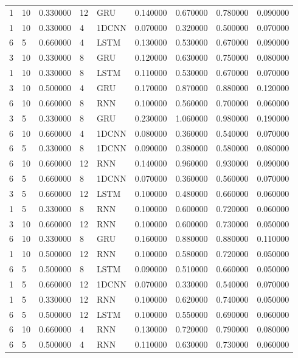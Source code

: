 \begin{tabular}{llrllrrrr}
1 & 10 & 0.330000 & 12 & GRU & 0.140000 & 0.670000 & 0.780000 & 0.090000 \\
1 & 10 & 0.330000 & 4 & 1DCNN & 0.070000 & 0.320000 & 0.500000 & 0.070000 \\
6 & 5 & 0.660000 & 4 & LSTM & 0.130000 & 0.530000 & 0.670000 & 0.090000 \\
3 & 10 & 0.330000 & 8 & GRU & 0.120000 & 0.630000 & 0.750000 & 0.080000 \\
1 & 10 & 0.330000 & 8 & LSTM & 0.110000 & 0.530000 & 0.670000 & 0.070000 \\
3 & 10 & 0.500000 & 4 & GRU & 0.170000 & 0.870000 & 0.880000 & 0.120000 \\
6 & 10 & 0.660000 & 8 & RNN & 0.100000 & 0.560000 & 0.700000 & 0.060000 \\
3 & 5 & 0.330000 & 8 & GRU & 0.230000 & 1.060000 & 0.980000 & 0.190000 \\
6 & 10 & 0.660000 & 4 & 1DCNN & 0.080000 & 0.360000 & 0.540000 & 0.070000 \\
6 & 5 & 0.330000 & 8 & 1DCNN & 0.090000 & 0.380000 & 0.580000 & 0.080000 \\
6 & 10 & 0.660000 & 12 & RNN & 0.140000 & 0.960000 & 0.930000 & 0.090000 \\
6 & 5 & 0.660000 & 8 & 1DCNN & 0.070000 & 0.360000 & 0.560000 & 0.070000 \\
3 & 5 & 0.660000 & 12 & LSTM & 0.100000 & 0.480000 & 0.660000 & 0.060000 \\
1 & 5 & 0.330000 & 8 & RNN & 0.100000 & 0.600000 & 0.720000 & 0.060000 \\
3 & 10 & 0.660000 & 12 & RNN & 0.100000 & 0.600000 & 0.730000 & 0.050000 \\
6 & 10 & 0.330000 & 8 & GRU & 0.160000 & 0.880000 & 0.880000 & 0.110000 \\
1 & 10 & 0.500000 & 12 & RNN & 0.100000 & 0.580000 & 0.720000 & 0.050000 \\
6 & 5 & 0.500000 & 8 & LSTM & 0.090000 & 0.510000 & 0.660000 & 0.050000 \\
1 & 5 & 0.660000 & 12 & 1DCNN & 0.070000 & 0.330000 & 0.540000 & 0.070000 \\
1 & 5 & 0.330000 & 12 & RNN & 0.100000 & 0.620000 & 0.740000 & 0.050000 \\
6 & 5 & 0.500000 & 12 & LSTM & 0.100000 & 0.550000 & 0.690000 & 0.060000 \\
6 & 10 & 0.660000 & 4 & RNN & 0.130000 & 0.720000 & 0.790000 & 0.080000 \\
6 & 5 & 0.500000 & 4 & RNN & 0.110000 & 0.630000 & 0.730000 & 0.060000 \\

\end{tabular}
